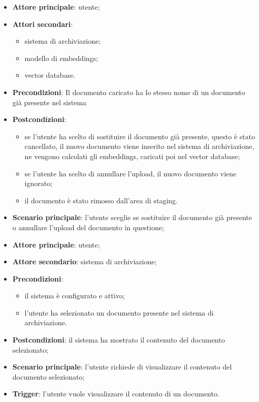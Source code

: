 \documentclass[10pt, a4paper]{article}
\begin{document}
    \begin{itemize}
        \item \textbf{Attore principale}: utente;
        \item \textbf{Attori secondari}:
        \begin{itemize}
            \item sistema di archiviazione;
            \item modello di embeddings;
            \item vector database.
        \end{itemize}
        \item \textbf{Precondizioni}: Il documento caricato ha lo stesso nome di un documento già presente nel sistema
        \item \textbf{Postcondizioni}:
        \begin{itemize}
            \item se l'utente ha scelto di sostituire il documento già presente, questo è stato cancellato, il nuovo documento viene inserito nel sistema di archiviazione, ne vengono calcolati gli embeddings, caricati poi nel vector database;
            \item se l'utente ha scelto di annullare l'upload, il nuovo documento viene ignorato;
            \item il documento è stato rimosso dall’area di staging.
        \end{itemize}
        \item \textbf{Scenario principale}: l’utente sceglie se sostituire il documento già presente o annullare l'upload del documento in questione;
    \end{itemize}

    \begin{itemize}
        \item \textbf{Attore principale}: utente;
        \item \textbf{Attore secondario}: sistema di archiviazione;
        \item \textbf{Precondizioni}:
        \begin{itemize}
            \item il sistema è configurato e attivo;
            \item l’utente ha selezionato un documento presente nel sistema di archiviazione.
        \end{itemize}
        \item \textbf{Postcondizioni}: il sistema ha mostrato il contenuto del documento selezionato;
        \item \textbf{Scenario principale}: l’utente richiede di visualizzare il contenuto del documento selezionato;
        \item \textbf{Trigger}: l’utente vuole visualizzare il contenuto di un documento.
    \end{itemize}
\end{document}
